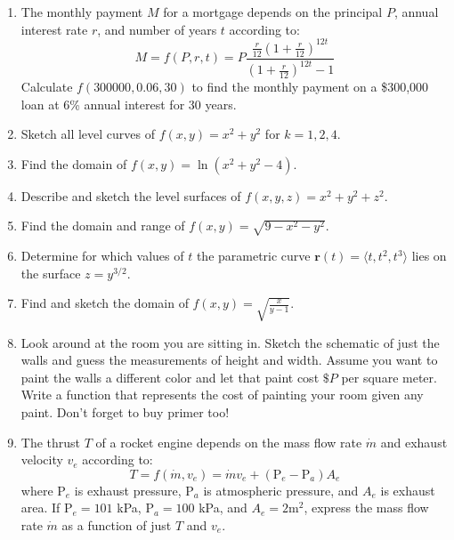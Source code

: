 \begin{multicols}{2}

\begin{enumerate}


    \item The monthly payment $M$ for a mortgage depends on the principal $P$, annual interest rate $r$, and number of years $t$ according to:
    \[
    M = f(P,r,t) = P\frac{\frac{r}{12}\left(1+\frac{r}{12}\right)^{12t}}{\left(1+\frac{r}{12}\right)^{12t}-1}
    \]
    Calculate $f(300000, 0.06, 30)$ to find the monthly payment on a \$300,000 loan at 6\% annual interest for 30 years.


    \item Sketch all level curves of $f(x,y) = x^2 + y^2$ for $k = 1,2,4$.
    
    \item Find the domain of $f(x,y) = \ln(x^2 + y^2 - 4)$.
    
    \item Describe and sketch the level surfaces of $f(x,y,z) = x^2 + y^2 + z^2$.
    
    \item Find the domain and range of $f(x,y) = \sqrt{9-x^2-y^2}$.
    
    \item Determine for which values of \( t \) the parametric curve $\mathbf{r}(t) = \langle t, t^2, t^3 \rangle$ lies on the surface $z = y^{3/2}$.
    
    \item Find and sketch the domain of $f(x,y) = \sqrt{\frac{x}{y-1}}$.
    
    \item Look around at the room you are sitting in. Sketch the schematic of just the walls and guess the measurements of height and width. Assume you want to paint the walls a different color and let that paint cost $\$ P$ per square meter. Write a function that represents the cost of painting your room given any paint. Don't forget to buy primer too!
    

    
    \item The thrust $T$ of a rocket engine depends on the mass flow rate $\dot{m}$ and exhaust velocity $v_e$ according to:
    \[
    T = f(\dot{m},v_e) = \dot{m}v_e + (\text{P}_e - \text{P}_a)A_e
    \]
    where $\text{P}_e$ is exhaust pressure, $\text{P}_a$ is atmospheric pressure, and $A_e$ is exhaust area. If $\text{P}_e = 101$ kPa, $\text{P}_a = 100$ kPa, and $A_e = 2 \text{m}^2$, express the mass flow rate $\dot{m}$ as a function of just $T$ and $v_e$.
    

\end{enumerate}
\end{multicols}
